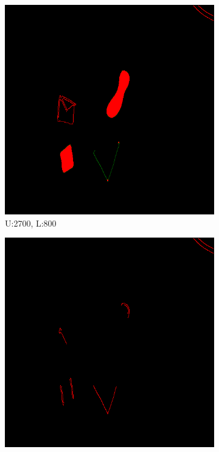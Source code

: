 \documentclass[11pt]{article}
\begin{document}
\begin{figure}[!h]
	
	\begin{subfigure}[t]{.25\textwidth}
		\centering
		\includegraphics[scale=0.3]{pics/normalThreshTest/Upper2700lower800kernel5.png}
		\caption{U:2700, L:800}
	\end{subfigure}
\hfill
	\begin{subfigure}[t]{.25\textwidth}
		\centering
		\includegraphics[scale=0.3]{pics/normalThreshTest/Upper2700lower1400kernel5.png}

\end{subfigure}
\end{figure}
\end{document}
